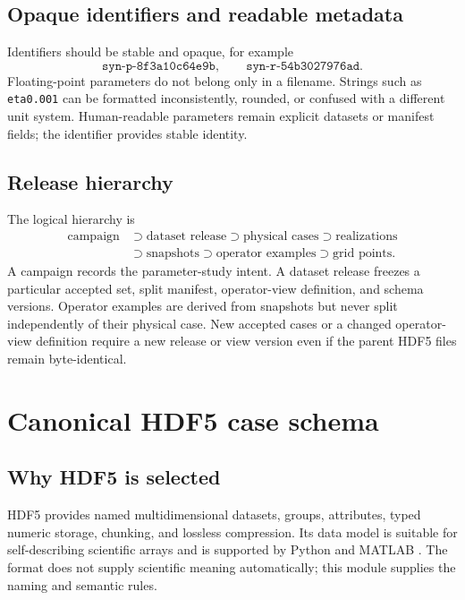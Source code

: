 \documentclass[11pt]{article}
\newcommand{\code}[1]{\texttt{#1}}
\begin{document}
\subsection{Opaque identifiers and readable metadata}

Identifiers should be stable and opaque, for example
\begin{equation}
\code{syn-p-8f3a10c64e9b},
\qquad
\code{syn-r-54b3027976ad}.
\end{equation}
Floating-point parameters do not belong only in a filename. Strings such as \code{eta0.001} can be formatted inconsistently, rounded, or confused with a different unit system. Human-readable parameters remain explicit datasets or manifest fields; the identifier provides stable identity.

\subsection{Release hierarchy}

The logical hierarchy is
\begin{equation}
\begin{aligned}
\text{campaign}&\supset\text{dataset release}\supset\text{physical cases}\supset\text{realizations}\\
&\supset\text{snapshots}\supset\text{operator examples}\supset\text{grid points}.
\end{aligned}
\end{equation}
A campaign records the parameter-study intent. A dataset release freezes a particular accepted set, split manifest, operator-view definition, and schema versions. Operator examples are derived from snapshots but never split independently of their physical case. New accepted cases or a changed operator-view definition require a new release or view version even if the parent HDF5 files remain byte-identical.

\section{Canonical HDF5 case schema}
\label{sec:hdf5}

\subsection{Why HDF5 is selected}

HDF5 provides named multidimensional datasets, groups, attributes, typed numeric storage, chunking, and lossless compression. Its data model is suitable for self-describing scientific arrays and is supported by Python and MATLAB \cite{HDFPreservation}. The format does not supply scientific meaning automatically; this module supplies the naming and semantic rules.
\end{document}
